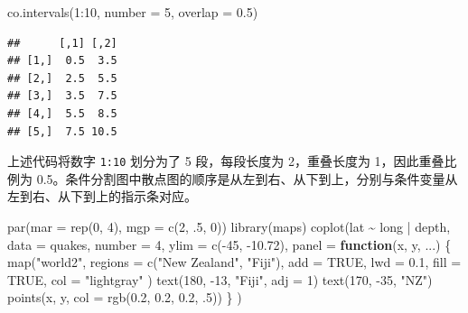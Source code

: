 \documentclass[
  b5paper,
  UTF8,twoside]{book}
\newenvironment{Shaded}{\begin{snugshade}}{\end{snugshade}}
\newcommand{\AttributeTok}[1]{\textcolor[rgb]{0.77,0.63,0.00}{#1}}
\newcommand{\ConstantTok}[1]{\textcolor[rgb]{0.00,0.00,0.00}{#1}}
\newcommand{\ControlFlowTok}[1]{\textcolor[rgb]{0.13,0.29,0.53}{\textbf{#1}}}
\newcommand{\DecValTok}[1]{\textcolor[rgb]{0.00,0.00,0.81}{#1}}
\newcommand{\FloatTok}[1]{\textcolor[rgb]{0.00,0.00,0.81}{#1}}
\newcommand{\FunctionTok}[1]{\textcolor[rgb]{0.00,0.00,0.00}{#1}}
\newcommand{\NormalTok}[1]{#1}
\newcommand{\SpecialCharTok}[1]{\textcolor[rgb]{0.00,0.00,0.00}{#1}}
\newcommand{\StringTok}[1]{\textcolor[rgb]{0.31,0.60,0.02}{#1}}
\begin{document}
\begin{Shaded}
\begin{Highlighting}[]
\FunctionTok{co.intervals}\NormalTok{(}\DecValTok{1}\SpecialCharTok{:}\DecValTok{10}\NormalTok{, }\AttributeTok{number =} \DecValTok{5}\NormalTok{, }\AttributeTok{overlap =} \FloatTok{0.5}\NormalTok{)}
\end{Highlighting}
\end{Shaded}

\begin{verbatim}
##      [,1] [,2]
## [1,]  0.5  3.5
## [2,]  2.5  5.5
## [3,]  3.5  7.5
## [4,]  5.5  8.5
## [5,]  7.5 10.5
\end{verbatim}

上述代码将数字 \texttt{1:10} 划分为了 5 段，每段长度为 2，重叠长度为 1，因此重叠比例为 0.5。条件分割图中散点图的顺序是从左到右、从下到上，分别与条件变量从左到右、从下到上的指示条对应。





\begin{Shaded}
\begin{Highlighting}[]
\FunctionTok{par}\NormalTok{(}\AttributeTok{mar =} \FunctionTok{rep}\NormalTok{(}\DecValTok{0}\NormalTok{, }\DecValTok{4}\NormalTok{), }\AttributeTok{mgp =} \FunctionTok{c}\NormalTok{(}\DecValTok{2}\NormalTok{, .}\DecValTok{5}\NormalTok{, }\DecValTok{0}\NormalTok{))}
\FunctionTok{library}\NormalTok{(maps)}
\FunctionTok{coplot}\NormalTok{(lat }\SpecialCharTok{\textasciitilde{}}\NormalTok{ long }\SpecialCharTok{|}\NormalTok{ depth,}
  \AttributeTok{data =}\NormalTok{ quakes, }\AttributeTok{number =} \DecValTok{4}\NormalTok{,}
  \AttributeTok{ylim =} \FunctionTok{c}\NormalTok{(}\SpecialCharTok{{-}}\DecValTok{45}\NormalTok{, }\SpecialCharTok{{-}}\FloatTok{10.72}\NormalTok{), }\AttributeTok{panel =} \ControlFlowTok{function}\NormalTok{(x, y, ...) \{}
    \FunctionTok{map}\NormalTok{(}\StringTok{"world2"}\NormalTok{,}
      \AttributeTok{regions =} \FunctionTok{c}\NormalTok{(}\StringTok{"New Zealand"}\NormalTok{, }\StringTok{"Fiji"}\NormalTok{),}
      \AttributeTok{add =} \ConstantTok{TRUE}\NormalTok{, }\AttributeTok{lwd =} \FloatTok{0.1}\NormalTok{, }\AttributeTok{fill =} \ConstantTok{TRUE}\NormalTok{, }\AttributeTok{col =} \StringTok{"lightgray"}
\NormalTok{    )}
    \FunctionTok{text}\NormalTok{(}\DecValTok{180}\NormalTok{, }\SpecialCharTok{{-}}\DecValTok{13}\NormalTok{, }\StringTok{"Fiji"}\NormalTok{, }\AttributeTok{adj =} \DecValTok{1}\NormalTok{)}
    \FunctionTok{text}\NormalTok{(}\DecValTok{170}\NormalTok{, }\SpecialCharTok{{-}}\DecValTok{35}\NormalTok{, }\StringTok{"NZ"}\NormalTok{)}
    \FunctionTok{points}\NormalTok{(x, y, }\AttributeTok{col =} \FunctionTok{rgb}\NormalTok{(}\FloatTok{0.2}\NormalTok{, }\FloatTok{0.2}\NormalTok{, }\FloatTok{0.2}\NormalTok{, .}\DecValTok{5}\NormalTok{))}
\NormalTok{  \}}
\NormalTok{)}
\end{Highlighting}
\end{Shaded}
\end{document}
